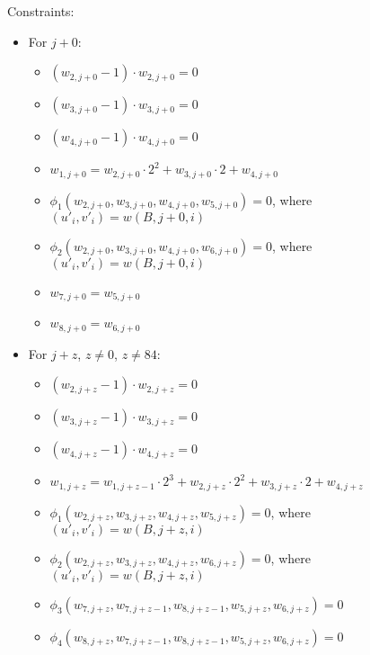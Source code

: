 Constraints:
\begin{itemize}
    \item For $j + 0$:
        \begin{itemize}
            \item $(w_{2, j + 0} - 1) \cdot w_{2, j + 0} = 0$ 
        	 \item $(w_{3, j + 0} - 1) \cdot w_{3, j + 0} = 0$
        	 \item $(w_{4, j + 0} - 1) \cdot w_{4, j + 0} = 0$ 
            \item $w_{1, j + 0} = w_{2, j + 0} \cdot 2^2 + w_{3, j + 0} \cdot 2 + w_{4, j + 0}$
            \item $\phi_1(w_{2, j + 0}, w_{3, j + 0}, w_{4, j + 0}, w_{5, j + 0}) = 0$, where $(u'_{i}, v'_{i}) = w(B, j + 0, i)$
            \item $\phi_2(w_{2, j + 0}, w_{3, j + 0}, w_{4, j + 0}, w_{6, j + 0}) = 0$, where $(u'_{i}, v'_{i}) = w(B, j + 0, i)$
            \item $w_{7, j + 0} = w_{5, j + 0}$
            \item $w_{8, j + 0} = w_{6, j + 0}$
        \end{itemize}
    \item For $j + z$, $z \neq 0$, $z \neq 84$:
        \begin{itemize}
            \item $(w_{2, j + z} - 1) \cdot w_{2, j + z} = 0$ 
        	 \item $(w_{3, j + z} - 1) \cdot w_{3, j + z} = 0$
        	 \item $(w_{4, j + z} - 1) \cdot w_{4, j + z} = 0$ 
            \item $w_{1, j + z} = w_{1, j + z - 1} \cdot 2^3 + w_{2, j + z} \cdot 2^2 + w_{3, j + z} \cdot 2 + w_{4, j + z}$
            \item $\phi_1(w_{2, j + z}, w_{3, j + z}, w_{4, j + z}, w_{5, j + z}) = 0$, where $(u'_{i}, v'_{i}) = w(B, j + z, i)$
            \item $\phi_2(w_{2, j + z}, w_{3, j + z}, w_{4, j + z}, w_{6, j + z }) = 0$, where $(u'_{i}, v'_{i}) = w(B, j + z, i)$
            \item $\phi_3(w_{7, j + z}, w_{7, j + z - 1}, w_{8, j + z - 1}, w_{5, j + z}, w_{6, j + z }) = 0$
            \item $\phi_4(w_{8, j + z}, w_{7, j + z - 1}, w_{8, j + z - 1}, w_{5, j + z}, w_{6, j + z }) = 0$
        \end{itemize}


\end{itemize}
